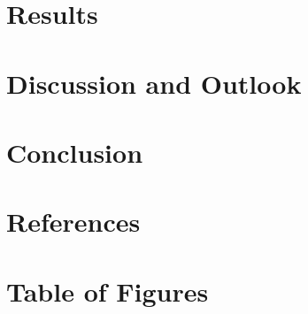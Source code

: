 \documentclass{article}
\newcommand{\comment}[1]{}
\begin{document}
	
	
	
	
	\section{Results}
	\section{Discussion and Outlook}
	\section{Conclusion}
	
	\section{References}
	\printbibliography[
	heading=bibintoc,
	title={Bibliography}
	]	
	\section{Table of Figures}
	\comment{(short table on which every figure description with the page number is listed)}
\end{document}
